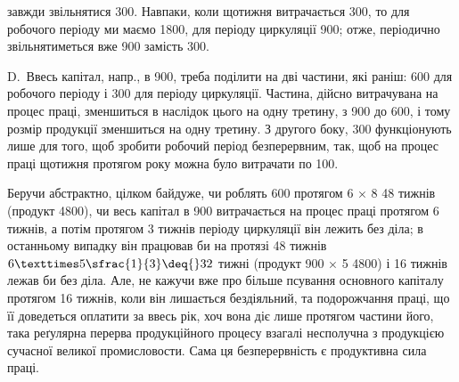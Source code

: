 \parcont{}  %
завжди звільнятися 300. Навпаки, коли щотижня витрачається
300, то для робочого періоду ми маємо 1800, для періоду
циркуляції 900; отже, періодично звільнятиметься вже 900
замість 300.

D.~Ввесь капітал, напр., в 900, треба поділити на дві частини,
які раніш: 600 для робочого періоду і 300 для періоду
циркуляції. Частина, дійсно витрачувана на процес праці, зменшиться в
наслідок цього на одну третину, з 900 до 600, і тому розмір продукції
зменшиться на одну третину. З другого боку, 300
функціонують лише для того, щоб зробити робочий період безперервним,
так, щоб на процес праці щотижня протягом року можна було витрачати
по 100.

Беручи абстрактно, цілком байдуже, чи роблять 600 протягом
6 × 8 \deq{} 48 тижнів (продукт \deq{} 4800), чи весь капітал в 900
витрачається на процес праці протягом 6 тижнів, а потім протягом
3 тижнів періоду циркуляції він лежить без діла; в останньому випадку
він працював би на протязі 48 тижнів $6 × 5\sfrac{1}{3} \deq{} 32$ тижні (продукт \deq{}
900 × 5 \deq{} 4800) і 16 тижнів лежав би без діла. Але, не кажучи
вже про більше псування основного капіталу протягом 16 тижнів, коли
він лишається бездіяльний, та подорожчання праці, що її доведеться оплатити
за ввесь рік, хоч вона діє лише протягом частини його, така реґулярна
перерва продукційного процесу взагалі несполучна з продукцією
сучасної великої промисловости. Сама ця безперервність є продуктивна
сила праці.

